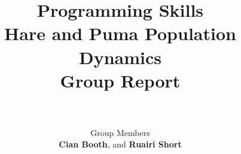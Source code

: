 \documentclass[12pt]{article}    %
\title{\textbf{Programming Skills}\\Hare and Puma Population Dynamics\\Group Report}  %
\author{\\\\Group Members\\\textbf{Cian Booth}, \textbf{\pa} and \textbf{Ruairi Short}}     %
\date{}   %
\numberwithin{equation}{section}
\begin{document}

\maketitle                 %
\begin{center}

\abstract{}
\clearpage
{}
\end{center}

\newpage










\end{document}
